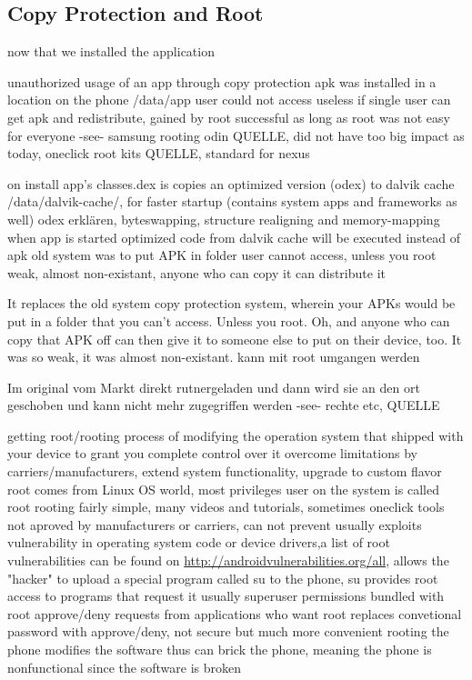 \subsection{Copy Protection and Root} \label{subsection:android-copyroot}
now that we installed the application

unauthorized usage of an app through copy protection
apk was installed in a location on the phone /data/app user could not access
useless if single user can get apk and redistribute, gained by root
successful as long as root was not easy for everyone -see- samsung rooting odin QUELLE, did not have too big impact as today, oneclick root kits QUELLE, standard for nexus

on install app's classes.dex is copies an optimized version (odex) to dalvik cache /data/dalvik-cache/, for faster startup (contains system apps and frameworks as well)
odex erklären, byteswapping, structure realigning and memory-mapping
when app is started optimized code from dalvik cache will be executed instead of apk
old system was to put APK in folder user cannot access, unless you root
weak, almost non-existant, anyone who can copy it can distribute it

It replaces the old system copy protection system, wherein your APKs would be put in a folder that you can't access. Unless you root. Oh, and anyone who can copy that APK off can then give it to someone else to put on their device, too. It was so weak, it was almost non-existant.
kann mit root umgangen werden

Im original vom Markt direkt rutnergeladen und dann wird sie an den ort geschoben und kann nicht mehr zugegriffen werden -see- rechte etc, QUELLE



getting root/rooting process of modifying the operation system that shipped with your device to grant you complete control over it
overcome limitations by carriers/manufacturers, extend system functionality, upgrade to custom flavor
root comes from Linux OS world, most privileges user on the system is called root
rooting fairly simple, many videos and tutorials, sometimes oneclick tools
not aproved by manufacturers or carriers, can not prevent usually exploits vulnerability in operating system code or device drivers,a list of root vulnerabilities can be found on \url{http://androidvulnerabilities.org/all}, allows the "hacker" to upload a special program called su to the phone,
su provides root access to programs that request it
usually superuser permissions bundled with root
approve/deny requests from applications who want root
replaces convetional password with approve/deny, not secure but much more convenient
rooting the phone modifies the software thus can brick the phone, meaning the phone is nonfunctional since the software is broken

